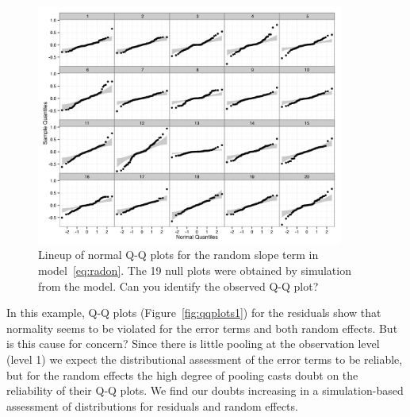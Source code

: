 \documentclass{article} %
\newcommand{\al}[1]{{\color{red} #1}}
\begin{document}
\begin{figure}[htb]
	\centering
	\includegraphics[width=0.9\textwidth]{test.jpeg}%
	\caption{\label{fig:lineup} Lineup of normal Q-Q plots for the random slope term in model~\eqref{eq:radon}. The 19 null plots were obtained by simulation from the model. Can you identify the observed Q-Q plot?}
\end{figure}

In this example, Q-Q plots (Figure~\ref{fig:qqplots1}) for the residuals show that normality 
seems to be violated 
for the error terms and both random effects. But is this cause for concern?
\al{Since} there is little pooling at the observation level \al{(level 1)} we expect the distributional assessment of the error terms to be reliable, but  for the random effects the high degree of pooling  casts doubt on the reliability of their Q-Q plots. 
We find our doubts increasing in a simulation-based assessment of distributions for residuals and random effects.
\end{document}
